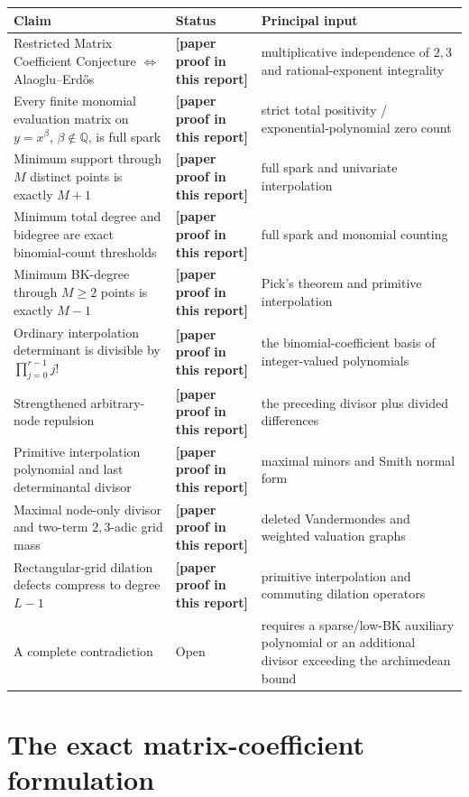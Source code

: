 \documentclass[11pt,oneside]{article}
\theoremstyle{definition}
\theoremstyle{remark}
\newcommand{\Q}{\mathbb Q}
\newcommand{\statusnew}{\textcolor{newgreen}{\textbf{[paper proof in this report]}}}
\begin{document}
\begin{center}
\small
\begin{tabularx}{0.96\textwidth}{>{\raggedright\arraybackslash}X
                                  >{\raggedright\arraybackslash}p{}
                                  >{\raggedright\arraybackslash}p{}}
\toprule
Claim & Status & Principal input \\
\midrule
Restricted Matrix Coefficient Conjecture $\Longleftrightarrow$ Alaoglu--Erd\H{o}s &
\statusnew & multiplicative independence of $2,3$ and rational-exponent integrality \\
Every finite monomial evaluation matrix on $y=x^\beta$, $\beta\notin\Q$, is full spark &
\statusnew & strict total positivity / exponential-polynomial zero count \\
Minimum support through $M$ distinct points is exactly $M+1$ &
\statusnew & full spark and univariate interpolation \\
Minimum total degree and bidegree are exact binomial-count thresholds &
\statusnew & full spark and monomial counting \\
Minimum BK-degree through $M\ge2$ points is exactly $M-1$ &
\statusnew & Pick's theorem and primitive interpolation \\
Ordinary interpolation determinant is divisible by $\prod_{j=0}^{r-1}j!$ &
\statusnew & the binomial-coefficient basis of integer-valued polynomials \\
Strengthened arbitrary-node repulsion &
\statusnew & the preceding divisor plus divided differences \\
Primitive interpolation polynomial and last determinantal divisor &
\statusnew & maximal minors and Smith normal form \\
Maximal node-only divisor and two-term $2,3$-adic grid mass &
\statusnew & deleted Vandermondes and weighted valuation graphs \\
Rectangular-grid dilation defects compress to degree $L-1$ &
\statusnew & primitive interpolation and commuting dilation operators \\
A complete contradiction & Open & requires a sparse/low-BK auxiliary polynomial or
an additional divisor exceeding the archimedean bound \\
\bottomrule
\end{tabularx}
\end{center}

\section{The exact matrix-coefficient formulation}
\label{sec:mcc}
\end{document}
